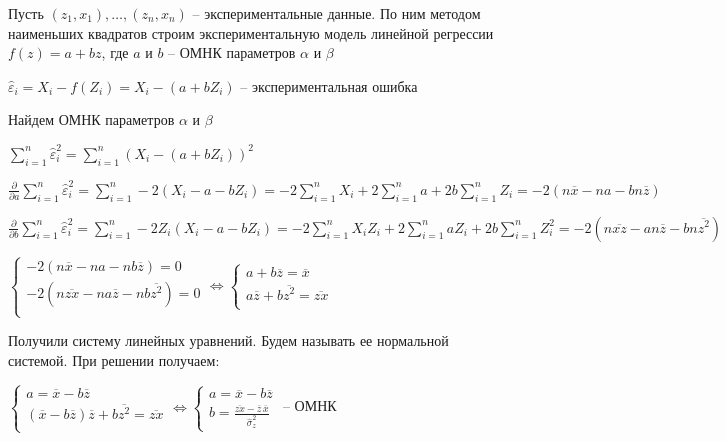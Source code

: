 \begin{enumerate}
    Пусть $(z_1, x_1), \dots, (z_n, x_n)$ -- экспериментальные данные. По ним методом наименьших квадратов строим
    экспериментальную модель линейной регрессии $f(z) = a + b z$, где $a$ и $b$ -- ОМНК параметров $\alpha$ и $\beta$

    $\hat \varepsilon_i = X_i - f(Z_i) = X_i - (a + b Z_i)$ -- экспериментальная ошибка

    Найдем ОМНК параметров $\alpha$ и $\beta$

    $\sum_{i = 1}^n \hat \varepsilon_i^2 = \sum_{i = 1}^n (X_i - (a + b Z_i))^2$

    $\frac{\partial}{\partial a} \sum_{i = 1}^n \hat \varepsilon_i^2 = \sum_{i = 1}^n -2 (X_i - a - b Z_i) = 
    -2 \sum_{i = 1}^n X_i + 2\sum_{i = 1}^n a + 2b \sum_{i = 1}^n Z_i = -2(n \overline{x} - na - bn \overline{z})$

    $\frac{\partial}{\partial b} \sum_{i = 1}^n \hat \varepsilon_i^2 = \sum_{i = 1}^n -2 Z_i (X_i - a - b Z_i) = 
    -2 \sum_{i = 1}^n X_i Z_i + 2\sum_{i = 1}^n a Z_i + 2b \sum_{i = 1}^n Z_i^2 = -2(n \overline{x z} - a n \overline{z} - bn \overline{z^2})$

    $\begin{cases}
        -2 (n \overline{x} - na - nb \overline{z}) = 0 \\
        -2 (n \overline{zx} - na \overline{z} - nb \overline{z^2}) = 0 \\
    \end{cases} \Longleftrightarrow \begin{cases}
        a + b\overline{z} = \overline{x} \\
        a\overline{z} + b \overline{z^2} = \overline{zx} \\
    \end{cases}$

    Получили систему линейных уравнений. Будем называть ее нормальной системой. При решении получаем:

    $\begin{cases}
        a = \overline{x} - b \overline{z} \\
        (\overline{x} - b \overline{z}) \overline{z} + b \overline{z^2} = \overline{zx} \\
    \end{cases} \Longleftrightarrow \begin{cases}
        a = \overline{x} - b \overline{z} \\
        b = \frac{\overline{zx} - \overline{z} \, \overline{x}}{\hat \sigma^2_z}
    \end{cases}$ -- ОМНК 


\end{enumerate}
